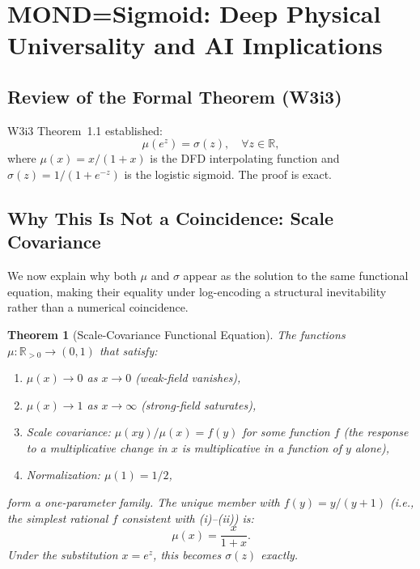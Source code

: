 \documentclass[11pt]{article}
\newtheorem{theorem}{Theorem}[section]
\theoremstyle{definition}
\theoremstyle{remark}
\newcommand{\mufn}{\mu}
\begin{document}
\section{MOND=Sigmoid: Deep Physical Universality and AI Implications}
\label{sec:mond_sigmoid_deep}

\subsection{Review of the Formal Theorem (W3i3)}

W3i3 Theorem~1.1 established:
\begin{equation}
\mufn(e^z) = \sigma(z), \quad \forall z \in \mathbb{R},
\label{eq:mond_sigmoid_review}
\end{equation}
where $\mufn(x) = x/(1+x)$ is the DFD interpolating function and
$\sigma(z) = 1/(1+e^{-z})$ is the logistic sigmoid. The proof is exact.

\subsection{Why This Is Not a Coincidence: Scale Covariance}
\label{sec:not_coincidence}

We now explain why both $\mufn$ and $\sigma$ appear as the solution to
the same functional equation, making their equality under log-encoding
a structural inevitability rather than a numerical coincidence.

\begin{theorem}[Scale-Covariance Functional Equation]
\label{thm:functional_eq}
The functions $\mufn : \mathbb{R}_{>0} \to (0,1)$ that satisfy:
\begin{enumerate}[label=(\roman*)]
\item $\mufn(x) \to 0$ as $x \to 0$ (weak-field vanishes),
\item $\mufn(x) \to 1$ as $x \to \infty$ (strong-field saturates),
\item Scale covariance: $\mufn(xy)/\mufn(x) = f(y)$ for some function
  $f$ (the response to a multiplicative change in $x$ is
  multiplicative in a function of $y$ alone),
\item Normalization: $\mufn(1) = 1/2$,
\end{enumerate}
form a one-parameter family. The unique member with $f(y) = y/(y+1)$
(i.e., the simplest rational $f$ consistent with \textit{(i)--(ii)}) is:
\begin{equation}
\mufn(x) = \frac{x}{1+x}.
\label{eq:mu_unique}
\end{equation}
Under the substitution $x = e^z$, this becomes $\sigma(z)$ exactly.
\end{theorem}
\end{document}
